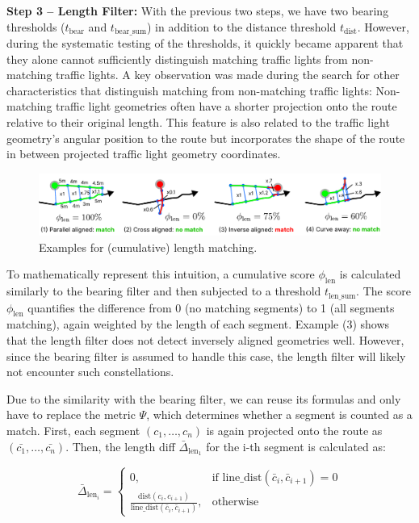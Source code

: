 \textbf{\color{cidarkblue}Step 3 -- Length Filter:} With the previous two steps, we have two bearing thresholds ($t_{\text{bear}}$ and $t_{\text{bear\_sum}}$) in addition to the distance threshold $t_{\text{dist}}$. However, during the systematic testing of the thresholds, it quickly became apparent that they alone cannot sufficiently distinguish matching traffic lights from non-matching traffic lights. A key observation was made during the search for other characteristics that distinguish matching from non-matching traffic lights: Non-matching traffic light geometries often have a shorter projection onto the route relative to their original length. This feature is also related to the traffic light geometry's angular position to the route but incorporates the shape of the route in between projected traffic light geometry coordinates.

\begin{figure}[t]
\centering
\includegraphics[width=\linewidth]{images/sg-selection-length-filter-sum.pdf}
\caption{Examples for (cumulative) length matching.}
\label{fig:sg-selection-length-filter-sum}
\end{figure}

To mathematically represent this intuition, a cumulative score $\phi_{\text{len}}$ is calculated similarly to the bearing filter and then subjected to a threshold $t_{\text{len\_sum}}$. The score $\phi_{\text{len}}$ quantifies the difference from 0 (no matching segments) to 1 (all segments matching), again weighted by the length of each segment. Example (3) shows that the length filter does not detect inversely aligned geometries well. However, since the bearing filter is assumed to handle this case, the length filter will likely not encounter such constellations.

Due to the similarity with the bearing filter, we can reuse its formulas and only have to replace the metric $\Psi$, which determines whether a segment is counted as a match. First, each segment $(c_1, \dots, c_n)$ is again projected onto the route as $(\bar{c_1}, \dots, \bar{c_n})$. Then, the length diff $\bar{\Delta}_{\text{len}_1}$ for the i-th segment is calculated as:

\begin{equation}
    \bar{\Delta}_{\text{len}_i} = 
        \begin{cases}
            0,& \text{if } \text{line\_dist}(\bar{c}_i, \bar{c}_{i+1}) = 0 \\
            \frac{\text{dist}(c_{i}, c_{i+1})}{\text{line\_dist}(\bar{c}_{i}, \bar{c}_{i+1})},              & \text{otherwise}
        \end{cases}
\end{equation}

